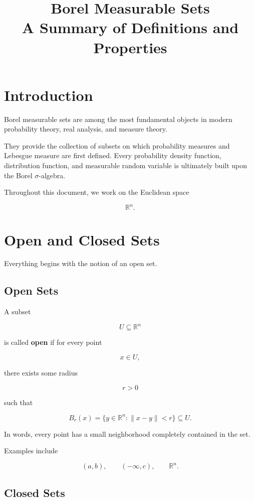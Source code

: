 \documentclass[11pt]{article}
\title{Borel Measurable Sets\\A Summary of Definitions and Properties}
\author{}
\date{}
\begin{document}
	
	\maketitle
	\tableofcontents
	
	\section{Introduction}
	
	Borel measurable sets are among the most fundamental objects in modern
	probability theory, real analysis, and measure theory.
	
	They provide the collection of subsets on which probability measures and
	Lebesgue measure are first defined. Every probability density function,
	distribution function, and measurable random variable is ultimately built
	upon the Borel $\sigma$-algebra.
	
	Throughout this document, we work on the Euclidean space
	
	\[
	\mathbb{R}^n.
	\]
	
	
	\section{Open and Closed Sets}
	
	Everything begins with the notion of an open set.
	
	\subsection{Open Sets}
	
	A subset
	
	\[
	U\subseteq\mathbb R^n
	\]
	
	is called \textbf{open} if for every point
	
	\[
	x\in U,
	\]
	
	there exists some radius
	
	\[
	r>0
	\]
	
	such that
	
	\[
	B_r(x)
	=
	\{y\in\mathbb R^n:\|x-y\|<r\}
	\subseteq U.
	\]
	
	In words, every point has a small neighborhood completely contained in the
	set.
	
	Examples include
	
	\[
	(a,b),
	\qquad
	(-\infty,c),
	\qquad
	\mathbb R^n.
	\]
	
	\subsection{Closed Sets}
	
\end{document}
